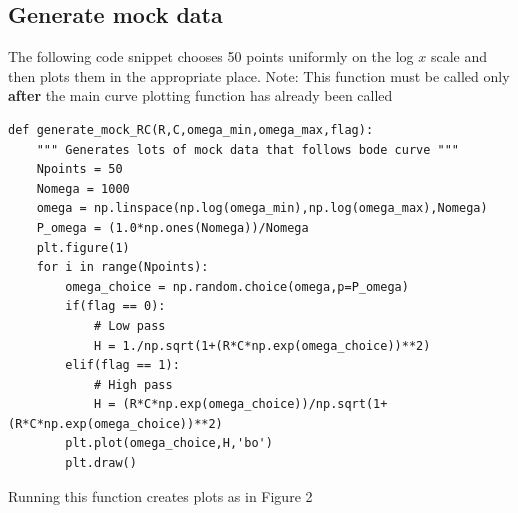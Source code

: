 \documentclass[english]{article}
\begin{document}
\subsection{Generate mock data}
The following code snippet chooses 50 points uniformly on the log $x$ scale 
and then plots them in the appropriate place. Note: This function must be 
called only \textbf{after} the main curve plotting function has already been
called
\begin{lstlisting}
def generate_mock_RC(R,C,omega_min,omega_max,flag):
    """ Generates lots of mock data that follows bode curve """
    Npoints = 50
    Nomega = 1000
    omega = np.linspace(np.log(omega_min),np.log(omega_max),Nomega)
    P_omega = (1.0*np.ones(Nomega))/Nomega
    plt.figure(1)
    for i in range(Npoints):
        omega_choice = np.random.choice(omega,p=P_omega)
        if(flag == 0):
            # Low pass
            H = 1./np.sqrt(1+(R*C*np.exp(omega_choice))**2)
        elif(flag == 1):
            # High pass
            H = (R*C*np.exp(omega_choice))/np.sqrt(1+(R*C*np.exp(omega_choice))**2)
        plt.plot(omega_choice,H,'bo')
        plt.draw()
\end{lstlisting}
Running this function creates plots as in Figure 2
\end{document}

